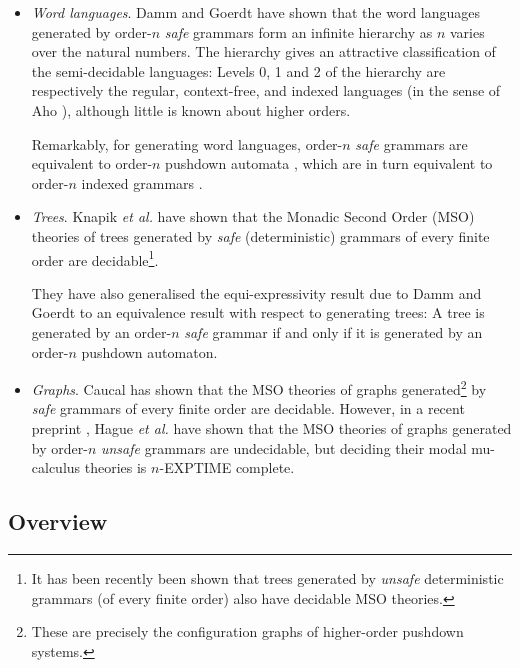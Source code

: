 \documentclass{llncs}
\begin{document}
\begin{itemize}
\item \emph{Word languages}. Damm and Goerdt \cite{DG86} have shown
  that the word languages generated by order-$n$ \emph{safe} grammars
  form an infinite hierarchy as $n$ varies over the natural numbers.
  The hierarchy gives an attractive classification of the
  semi-decidable languages: Levels 0, 1 and 2 of the hierarchy are
  respectively the regular, context-free, and indexed languages (in
  the sense of Aho \cite{Aho68}), although little is known about
  higher orders.

  Remarkably, for generating word languages, order-$n$ \emph{safe}
  grammars are equivalent to order-$n$ pushdown automata \cite{DG86},
  which are in turn equivalent to order-$n$ indexed grammars
  \cite{Mas74,Mas76}.

\item \emph{Trees}. Knapik \emph{et al.} have shown that the Monadic
  Second Order (MSO) theories of trees generated by \emph{safe}
  (deterministic) grammars of every finite order are
  decidable\footnote{It has been recently been shown
    \cite{OngLics2006} that trees generated by \emph{unsafe}
    deterministic grammars (of every finite order) also have decidable
    MSO theories.}.

  They have also generalised the equi-expressivity result due to Damm
  and Goerdt \cite{DG86} to an equivalence result with respect to
  generating trees: A tree is generated by an order-$n$ \emph{safe}
  grammar if and only if it is generated by an order-$n$ pushdown
  automaton.

\item \emph{Graphs}. Caucal \cite{Cau02} has shown that the MSO
  theories of graphs generated\footnote{These are precisely the
    configuration graphs of higher-order pushdown systems.} by
  \emph{safe} grammars of every finite order are decidable. However,
  in a recent preprint \cite{hague-sto07}, Hague \emph{et al.} have
  shown that the MSO theories of graphs generated by order-$n$
  \emph{unsafe} grammars are undecidable, but deciding their modal
  mu-calculus theories is $n$-EXPTIME complete.
\end{itemize}

\subsection*{Overview}
\end{document}
